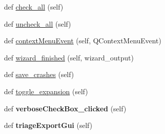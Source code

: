 \begin{DoxyCompactItemize}
def \mbox{\hyperlink{classgui_1_1_main_window_a242084a7ac9ffba4845f7dc6f83c4364}{check\+\_\+all}} (self)
\item 
def \mbox{\hyperlink{classgui_1_1_main_window_ac07c4a00566c0b6d75850af87a35c4cb}{uncheck\+\_\+all}} (self)
\item 
def \mbox{\hyperlink{classgui_1_1_main_window_a022a75eb1bdcbe6bb78a5a320bf72493}{context\+Menu\+Event}} (self, Q\+Context\+Menu\+Event)
\item 
def \mbox{\hyperlink{classgui_1_1_main_window_a0512eaf390eb7541b1f21d734e5ac5b4}{wizard\+\_\+finished}} (self, wizard\+\_\+output)
\item 
def \mbox{\hyperlink{classgui_1_1_main_window_a853bf5d74c10b4dce43bf7ce00cb1ffd}{save\+\_\+crashes}} (self)
\item 
def \mbox{\hyperlink{classgui_1_1_main_window_a0b61220e5a6e085331551359824d81d3}{toggle\+\_\+expansion}} (self)
\item 
\mbox{\label{classgui_1_1_main_window_ab1e73df77a6c2064bbcfef0f4ac2afc9}} 
def {\bfseries verbose\+Check\+Box\+\_\+clicked} (self)
\item 
\mbox{\label{classgui_1_1_main_window_a4de45539fe9e1e5634a93f3248b59da1}} 
def {\bfseries triage\+Export\+Gui} (self)
\end{DoxyCompactItemize}
